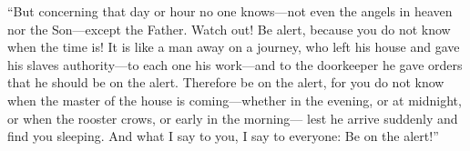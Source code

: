 \begin{biblechapter}
 “But concerning that day or hour no one knows—not even the angels in heaven nor the Son—except the Father.
\verse Watch out! Be alert, because you do not know when the time is!
\verse It is like a man away on a journey, who left his house and gave his slaves authority—to each one his work—and to the doorkeeper he gave orders that he should be on the alert.
\verse Therefore be on the alert, for you do not know when the master of the house is coming—whether in the evening, or at midnight, or when the rooster crows, or early in the morning—
\verse lest he arrive suddenly and find you sleeping.
\verse And what I say to you, I say to everyone: Be on the alert!”
\end{biblechapter}

